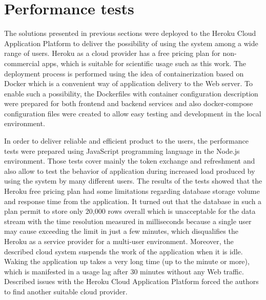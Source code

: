 \section{Performance tests}\label{sec:performance-tests}
The solutions presented in previous sections were deployed to the Heroku Cloud Application Platform to deliver the possibility of using the system among a wide range of users.
Heroku as a cloud provider has a free pricing plan for non-commercial apps, which is suitable for scientific usage such as this work.
The deployment process is performed using the idea of containerization based on Docker which is a convenient way of application delivery to the Web server.
To enable such a possibility, the \mbox{Dockerfiles} with container configuration description were prepared for both frontend and backend services and also docker-compose configuration files were created to allow easy testing and development in the local environment.

In order to deliver reliable and efficient product to the users, the performance tests were prepared using JavaScript programming language in the Node.js environment.
Those tests cover mainly the token exchange and refreshment and also allow to test the behavior of application during increased load produced by using the system by many different users.
The results of the tests showed that the Heroku free pricing plan had some limitations regarding database storage volume and response time from the application.
It turned out that the database in such a plan permit to store only 20,000 rows overall which is unacceptable for the data stream with the time resolution measured in milliseconds because a single user may cause exceeding the limit in just a few minutes, which disqualifies the Heroku as a service provider for a multi-user environment.
Moreover, the described cloud system suspends the work of the application when it is idle.
Waking the application up takes a very long time (up to the minute or more), which is manifested in a usage lag after 30 minutes without any Web traffic.
Described issues with the Heroku Cloud Application Platform forced the authors to find another suitable cloud provider.
